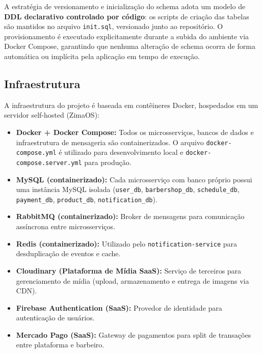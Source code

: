 \documentclass[
    12pt, 
    a4paper, 
    oneside, 
    chapter=TITLE, 
    section=TITLE
]{abntex2}
\begin{document}
A estratégia de versionamento e inicialização do schema adota um modelo de \textbf{DDL declarativo controlado por código}: os scripts de criação das tabelas são mantidos no arquivo \texttt{init.sql}, versionado junto ao repositório. O provisionamento é executado explicitamente durante a subida do ambiente via Docker Compose, garantindo que nenhuma alteração de schema ocorra de forma automática ou implícita pela aplicação em tempo de execução.

\subsection{Infraestrutura}
A infraestrutura do projeto é baseada em contêineres Docker, hospedados em um servidor self-hosted (ZimaOS):
\begin{itemize}
    \item \textbf{Docker + Docker Compose:} Todos os microsserviços, bancos de dados e infraestrutura de mensageria são containerizados. O arquivo \texttt{docker-compose.yml} é utilizado para desenvolvimento local e \texttt{docker-compose.server.yml} para produção.
    \item \textbf{MySQL (containerizado):} Cada microsserviço com banco próprio possui uma instância MySQL isolada (\texttt{user\_db}, \texttt{barbershop\_db}, \texttt{schedule\_db}, \texttt{payment\_db}, \texttt{product\_db}, \texttt{notification\_db}).
    \item \textbf{RabbitMQ (containerizado):} Broker de mensagens para comunicação assíncrona entre microsserviços.
    \item \textbf{Redis (containerizado):} Utilizado pelo \texttt{notification-service} para desduplicação de eventos e cache.
    \item \textbf{Cloudinary (Plataforma de Mídia SaaS):} Serviço de terceiros para gerenciamento de mídia (upload, armazenamento e entrega de imagens via CDN).
    \item \textbf{Firebase Authentication (SaaS):} Provedor de identidade para autenticação de usuários.
    \item \textbf{Mercado Pago (SaaS):} Gateway de pagamentos para split de transações entre plataforma e barbeiro.
\end{itemize}
\end{document}
